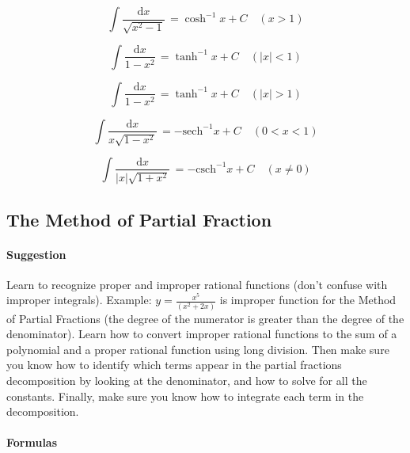 \documentclass[11pt]{article}
\begin{document}
			\begin{equation*}
				\int \! \frac{\mathrm{d}x}{\sqrt{x^2 - 1}} \, = \cosh^{-1}x + C \quad (x > 1) 
			\end{equation*}

			\begin{equation*}
				\int \! \frac{\mathrm{d}x}{1 - x^2} \, = \tanh^{-1}x + C  \quad (|x| < 1) 
			\end{equation*}

			\begin{equation*}
				\int \! \frac{\mathrm{d}x}{1 - x^2} \, = \tanh^{-1}x + C  \quad (|x| > 1)
			\end{equation*}
			
			\begin{equation*}
				\int \! \frac{\mathrm{d}x}{x\sqrt{1 - x^2}} \, = -\mathrm{sech}^{-1}x + C \quad (0 < x < 1)
			\end{equation*}
			
			\begin{equation*}
				\int \! \frac{\mathrm{d}x}{|x|\sqrt{1 + x^2}} \, = -\mathrm{csch}^{-1}x + C \quad (x \not= 0) 
			\end{equation*}

\pagebreak

	\subsection{The Method of Partial Fraction}
	
		\paragraph{Suggestion} Learn to recognize proper and improper rational functions (don't confuse with improper integrals).
Example: $y=\frac{x^5}{(x^2+2x)}$ is improper function for the Method of Partial Fractions (the degree of the numerator is greater than the degree of the denominator).
Learn how to convert improper rational functions to the sum of a polynomial and a proper rational function using long division. Then make sure you know how to identify which terms appear in the partial fractions decomposition by looking at the denominator, and how to solve for all the constants. Finally, make sure you know how to integrate each term in the decomposition.
		
		\paragraph{Formulas}
		
\end{document}
